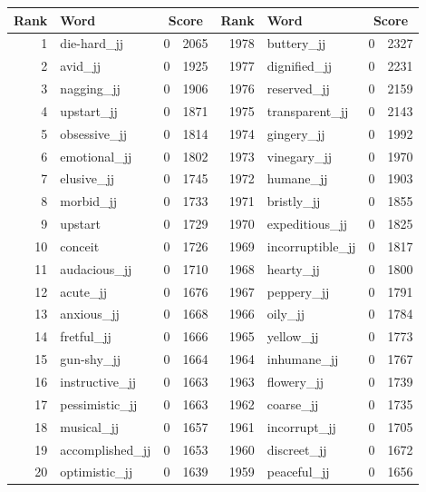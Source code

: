 \begin{table}[tbp]
    \begin{tabular}{| rlr@{.}l | rlr@{.}l |}
    \hline
    \textbf{Rank} & \textbf{Word} & \multicolumn{2}{c|}{\textbf{Score}} & \textbf{Rank} & \textbf{Word} & \multicolumn{2}{c|}{\textbf{Score}} \\
    \hline
    1 & die-hard\_jj & 0 & 2065    &    1978 & buttery\_jj & 0 & 2327 \\
    2 & avid\_jj & 0 & 1925    &    1977 & dignified\_jj & 0 & 2231 \\
    3 & nagging\_jj & 0 & 1906    &    1976 & reserved\_jj & 0 & 2159 \\
    4 & upstart\_jj & 0 & 1871    &    1975 & transparent\_jj & 0 & 2143 \\
    5 & obsessive\_jj & 0 & 1814    &    1974 & gingery\_jj & 0 & 1992 \\
    6 & emotional\_jj & 0 & 1802    &    1973 & vinegary\_jj & 0 & 1970 \\
    7 & elusive\_jj & 0 & 1745    &    1972 & humane\_jj & 0 & 1903 \\
    8 & morbid\_jj & 0 & 1733    &    1971 & bristly\_jj & 0 & 1855 \\
    9 & upstart & 0 & 1729    &    1970 & expeditious\_jj & 0 & 1825 \\
    10 & conceit & 0 & 1726    &    1969 & incorruptible\_jj & 0 & 1817 \\
    11 & audacious\_jj & 0 & 1710    &    1968 & hearty\_jj & 0 & 1800 \\
    12 & acute\_jj & 0 & 1676    &    1967 & peppery\_jj & 0 & 1791 \\
    13 & anxious\_jj & 0 & 1668    &    1966 & oily\_jj & 0 & 1784 \\
    14 & fretful\_jj & 0 & 1666    &    1965 & yellow\_jj & 0 & 1773 \\
    15 & gun-shy\_jj & 0 & 1664    &    1964 & inhumane\_jj & 0 & 1767 \\
    16 & instructive\_jj & 0 & 1663    &    1963 & flowery\_jj & 0 & 1739 \\
    17 & pessimistic\_jj & 0 & 1663    &    1962 & coarse\_jj & 0 & 1735 \\
    18 & musical\_jj & 0 & 1657    &    1961 & incorrupt\_jj & 0 & 1705 \\
    19 & accomplished\_jj & 0 & 1653    &    1960 & discreet\_jj & 0 & 1672 \\
    20 & optimistic\_jj & 0 & 1639    &    1959 & peaceful\_jj & 0 & 1656 \\

\end{tabular}
\end{table}
